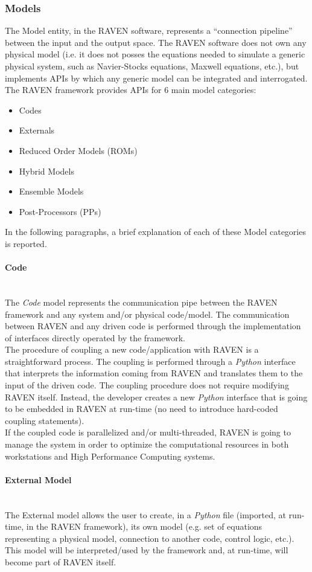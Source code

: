 \subsubsection{Models}
The Model entity, in the RAVEN software, represents a ``connection pipeline'' between the input and the output space. The 
RAVEN software does not own any physical model (i.e. it does not posses the equations needed to simulate a generic 
physical system, such as Navier-Stocks equations, Maxwell equations, etc.), but implements APIs by which any generic 
model can be integrated and interrogated. The RAVEN framework provides APIs for 
6 main model categories: 
\begin{itemize}
  \item Codes
  \item Externals
  \item Reduced Order Models (ROMs)
  \item Hybrid Models
  \item Ensemble Models
  \item Post-Processors (PPs)
\end{itemize}
In the 
following paragraphs, a brief explanation of each of these Model categories is reported.
\paragraph{Code} ~\\
The \textit{Code} model represents the communication pipe between the RAVEN framework and any system and/or 
physical code/model. The communication between RAVEN and any driven code is performed through the implementation 
of interfaces directly operated by the framework.
\\The procedure of coupling a new code/application with RAVEN is a straightforward process. The coupling is performed 
through a \textit{Python}  interface that interprets the information coming from RAVEN and translates them to the input of 
the driven code. The coupling procedure does not require modifying RAVEN itself. Instead, the developer creates a new 
\textit{Python} interface that is going to be embedded in RAVEN at run-time (no need to introduce hard-coded coupling 
statements). 
\\ If the coupled code is parallelized and/or multi-threaded, RAVEN is going to manage the system in order to optimize the 
computational resources in both workstations and High Performance Computing systems.

\paragraph{External Model} ~\\
The External model allows the user to create, in a \textit{Python} file (imported, at run-time, in the RAVEN framework), its 
own model (e.g. set of equations representing a physical model, connection to another code, control logic, etc.). This 
model will be interpreted/used by the framework and, at run-time, will become part of RAVEN itself.

